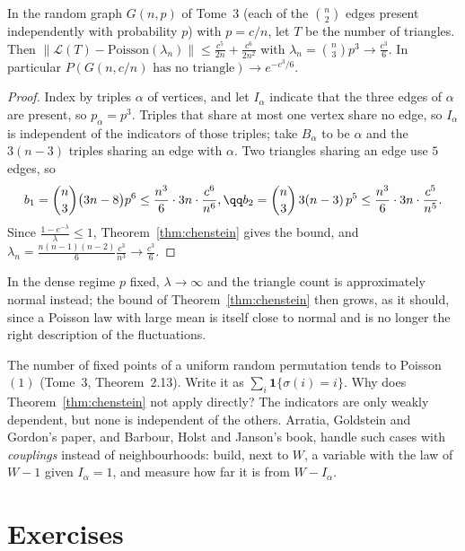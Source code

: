 \begin{example}\label{ex:triangles}
In the random graph $G(n,p)$ of Tome~3 (each of the $\binom n2$ edges present independently with probability $p$) with $p=c/n$, let $T$ be the number of
triangles. Then $\|\mathcal L(T)-\text{Poisson}(\lambda_n)\|\le\frac{c^5}{2n}+\frac{c^6}{2n^2}$ with $\lambda_n=\binom n3p^3\to\frac{c^3}6$. In particular
$P(G(n,c/n)\text{ has no triangle})\to e^{-c^3/6}$.
\end{example}
\begin{proof}
Index by triples $\alpha$ of vertices, and let $I_\alpha$ indicate that the three edges of $\alpha$ are present, so $p_\alpha=p^3$. Triples that share at most one vertex share
no edge, so $I_\alpha$ is independent of the indicators of those triples; take $B_\alpha$ to be $\alpha$ and the $3(n-3)$ triples sharing an edge with $\alpha$.
Two triangles sharing an edge use $5$ edges, so
\[
\begin{gathered}b_1=\binom n3\bigl(3n-8\bigr)p^6\le\frac{n^3}6\cdot3n\cdot\frac{c^6}{n^6},\qq b_2=\binom n3\,3(n-3)\,p^5\le\frac{n^3}6\cdot3n\cdot\frac{c^5}{n^5}.\end{gathered}
\]
Since $\frac{1-e^{-\lambda}}\lambda\le1$, Theorem~\ref{thm:chenstein} gives the bound, and $\lambda_n=\frac{n(n-1)(n-2)}6\frac{c^3}{n^3}\to\frac{c^3}6$.
\end{proof}

In the dense regime $p$ fixed, $\lambda\to\infty$ and the triangle count is approximately normal instead; the bound of Theorem~\ref{thm:chenstein} then grows, as it
should, since a Poisson law with large mean is itself close to normal and is no longer the right description of the fluctuations.

\begin{think}
The number of fixed points of a uniform random permutation tends to Poisson$(1)$ (Tome~3, Theorem~2.13). Write it as $\sum_i\mathbf 1\{\sigma(i)=i\}$. Why does
Theorem~\ref{thm:chenstein} not apply directly? The indicators are only weakly dependent, but none is independent of the others. Arratia, Goldstein and
Gordon's paper, and Barbour, Holst and Janson's book, handle such cases with \emph{couplings} instead of neighbourhoods: build, next to $W$, a variable with the
law of $W-1$ given $I_\alpha=1$, and measure how far it is from $W-I_\alpha$.
\end{think}

\section{Exercises}

